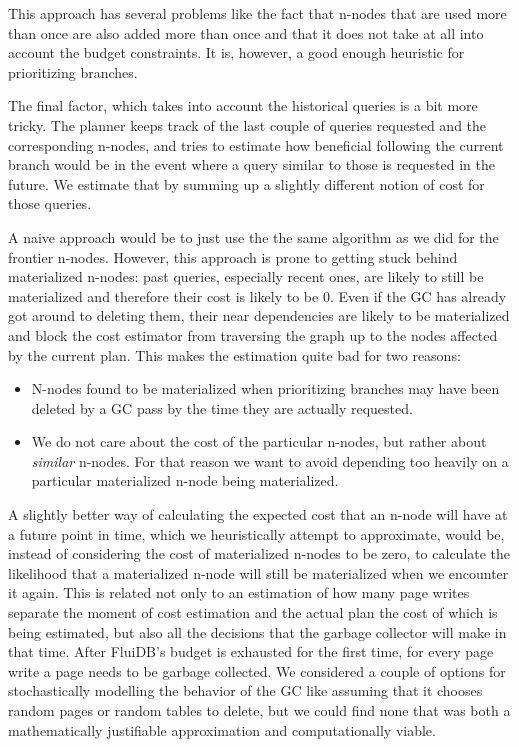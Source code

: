 This approach has several problems like the fact that n-nodes that are
used more than once are also added more than once and that it does not take
at all into account the budget constraints. It is, however, a good
enough heuristic for prioritizing branches.

The final factor, which takes into account the historical queries is a
bit more tricky. The planner keeps track of the last couple of queries
requested and the corresponding n-nodes, and tries to estimate how
beneficial following the current branch would be in the event where
a query similar to those is requested in the future. We estimate that
by summing up a slightly different notion of cost for those queries.

A naive approach would be to just use the the same algorithm as we did
for the frontier n-nodes. However, this approach is prone to getting
stuck behind materialized n-nodes: past queries, especially recent ones,
are likely to still be materialized and therefore their cost is likely
to be 0. Even if the GC has already got around to deleting them, their near
dependencies are likely to be materialized and block the cost estimator
from traversing the graph up to the nodes affected by the current plan. This makes
the estimation quite bad for two reasons:

\begin{itemize}
\item N-nodes found to be materialized when prioritizing branches may have been
  deleted by a GC pass by the time they are actually requested.
\item We do not care about the cost of the particular n-nodes, but rather
  about \emph{similar} n-nodes. For that reason we want to avoid
  depending too heavily on a particular materialized n-node being
  materialized.
\end{itemize}

A slightly better way of calculating the expected cost that an n-node will
have at a future point in time, which we
heuristically attempt to approximate, would be, instead of
considering the cost of materialized n-nodes to be zero, to calculate
the likelihood that a materialized n-node will still be materialized
when we encounter it again. This is related not only to an estimation
of how many page writes separate the moment of cost estimation and the
actual plan the cost of which is being estimated, but also all the
decisions that the garbage collector will make in that time. After
FluiDB's budget is exhausted for the first time, for every page write
a page needs to be garbage collected. We considered a couple of
options for stochastically modelling the behavior of the GC like
assuming that it chooses random pages or random tables to delete, but
we could find none that was both a mathematically justifiable approximation and
computationally viable.

